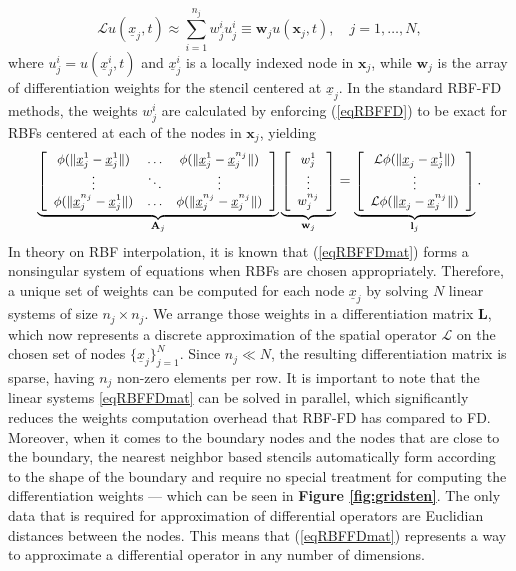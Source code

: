 \documentclass{UUThesisTemplate}
\begin{document}
\begin{equation}
\mathcal{L}u(\underline{x}_j, t)\approx\sum_{i=1}^{n_j}{w}_{j}^{i}u_j^{i}\equiv \mathbf{w}_j u(\mathbf{x}_j, t),\quad j=1,\ldots,N,
\label{eqRBFFD}
\end{equation}
where $u_j^{i}=u(\underline{x}_j^i,t)$ and $\underline{x}_j^i$ is a locally indexed node in $\mathbf{x}_j$, while $\mathbf{w}_j$ is the array of differentiation weights for the stencil centered at $\underline{x}_j$. In the standard RBF-FD methods, the weights ${w}_j^i$ are calculated by enforcing (\ref{eqRBFFD}) to be exact for RBFs centered at each of the nodes in $\mathbf{x}_j$, yielding
\begin{equation}
\label{eqRBFFDmat}
{\footnotesize{
\underbrace{\left[\begin{array}{cccc}
\phi(\|\underline{x}_j^{1}-\underline{x}_j^{1}\|) & \ldots & \phi(\|\underline{x}_j^{1}-\underline{x}_{j}^{n_j}\|)\\
\vdots & \ddots & \vdots\\
\phi(\|\underline{x}_{j}^{n_j}-\underline{x}_j^{1}\|) & \ldots & \phi(\|\underline{x}_{j}^{n_j}-\underline{x}_{j}^{n_j}\|)
\end{array}\right]}_{\mathbf{A}_j} \underbrace{\left[\begin{array}{c}
{w}_j^{1}\\
\vdots\\
{w}_{j}^{n_j}
\end{array}\right]}_{\mathbf{w}_j}=
\underbrace{\left[\begin{array}{c}
\mathcal{L}\phi(\|\underline{x}_{j}-\underline{x}_j^{1}\|)\\
\vdots \\
\mathcal{L}\phi(\|\underline{x}_{j}-\underline{x}_{{j}}^{n_j}\|)
\end{array}\right]}_{\mathbf{l}_j}.}}
\end{equation}
In theory on RBF interpolation, it is known that (\ref{eqRBFFDmat}) forms a nonsingular system of equations when RBFs are chosen appropriately. Therefore, a unique set of weights can be computed for each node $\underline{x}_j$ by solving $N$ linear systems of size $n_j\times n_j$. We arrange those weights in a differentiation matrix $\mathbf{L}$, which now represents a discrete approximation of the spatial operator $\mathcal{L}$ on the chosen set of nodes $\{\underline{x}_j\}_{j=1}^N$. Since $n_j \ll N$, the resulting differentiation matrix is sparse, having $n_j$ non-zero elements per row. It is important to note that the linear systems \eqref{eqRBFFDmat} can be solved in parallel, which significantly reduces the weights computation overhead that RBF-FD has compared to FD. Moreover, when it comes to the boundary nodes and the nodes that are close to the boundary, the nearest neighbor based stencils automatically form according to the shape of the boundary and require no special treatment for computing the differentiation weights --- which can be seen in \textbf{Figure \ref{fig:gridsten}}. The only data that is required for approximation of differential operators are Euclidian distances between the nodes. This means that (\ref{eqRBFFDmat}) represents a way to approximate a differential operator in any number of dimensions.
\end{document}
